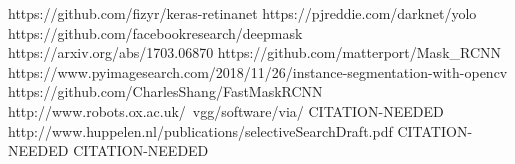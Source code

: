 \begin{thebibliography}{20}%



 https://github.com/fizyr/keras-retinanet
 https://pjreddie.com/darknet/yolo
 https://github.com/facebookresearch/deepmask
 https://arxiv.org/abs/1703.06870
 https://github.com/matterport/Mask\_RCNN
 https://www.pyimagesearch.com/2018/11/26/instance-segmentation-with-opencv
 https://github.com/CharlesShang/FastMaskRCNN
 http://www.robots.ox.ac.uk/~vgg/software/via/
 CITATION-NEEDED
 http://www.huppelen.nl/publications/selectiveSearchDraft.pdf
 CITATION-NEEDED
 CITATION-NEEDED

\end{thebibliography}


